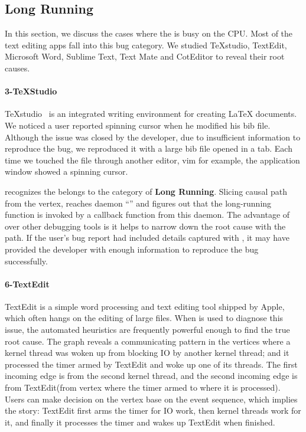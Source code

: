 \subsection{Long Running}

In this section, we discuss the cases where the \spinningnode is busy on the
CPU. Most of the text editing apps fall into this bug category. We studied
TeXstudio, TextEdit, Microsoft Word, Sublime Text, Text Mate and CotEditor to
reveal their root causes.


\paragraph{3-TeXStudio}

TeXstudio~\cite{TeXStudio} is an integrated writing environment for creating
LaTeX documents. We noticed a user reported spinning cursor when he
modified his bib file. Although the issue was closed by the developer, due to
insufficient information to reproduce the bug, we reproduced it with a large bib
file opened in a tab. Each time we touched the file through another editor, vim
for example, the application window showed a spinning cursor.

\xxx recognizes the \spinningnode belongs to the category of \textbf{Long
Running}. Slicing causal path from the vertex, \xxx reaches daemon
``'' and figures out that the long-running function is invoked by a callback
function from this daemon. The advantage of \xxx over other debugging tools is
it helps to narrow down the root cause with the path. If the user's bug report
had included details captured with \xxx, it may have provided the developer with
enough information to reproduce the bug successfully.

\paragraph{6-TextEdit}

TextEdit is a simple word processing and text editing tool shipped by Apple, which
often hangs on the editing of large files. 
When \xxx is used to diagnose this issue, the automated heuristics are frequently
powerful enough to find the true root cause.
The graph reveals a communicating pattern in the vertices where a kernel
thread was woken up from blocking IO by another kernel thread; and it processed
the timer armed by TextEdit and woke up one of its threads. The first incoming
edge is from the second kernel thread, and the second incoming edge is from
TextEdit(from vertex where the timer armed to where it is processed). Users can
make decision on the vertex base on the event sequence, which implies the story:
TextEdit first arms the timer for IO work, then kernel threads work for it, and
finally it processes the timer and wakes up TextEdit when finished.

